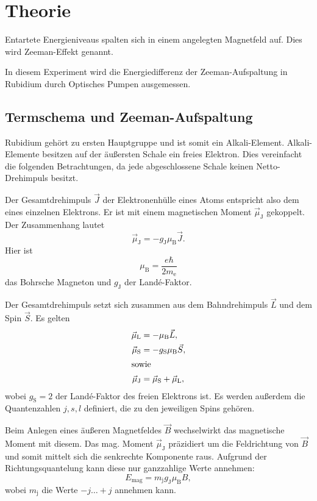 \section{Theorie}%
\label{sec:theorie}

Entartete Energieniveaus spalten sich in einem angelegten Magnetfeld auf.
Dies wird Zeeman-Effekt genannt.

In diesem Experiment wird die Energiedifferenz der Zeeman-Aufspaltung in
Rubidium durch Optisches Pumpen ausgemessen.


\subsection{Termschema und Zeeman-Aufspaltung}%
\label{sub:termschema_und_zeeman_aufspaltung}

Rubidium gehört zu ersten Hauptgruppe und ist somit ein Alkali-Element.
Alkali-Elemente besitzen auf der äußersten Schale ein freies Elektron.
Dies vereinfacht die folgenden Betrachtungen, da jede abgeschlossene Schale
keinen Netto-Drehimpuls besitzt.

Der Gesamtdrehimpuls $\vec{J}$ der Elektronenhülle eines Atoms entspricht also
dem eines einzelnen Elektrons.
Er ist mit einem magnetischen Moment $\vec{\mu}_{\text{J}}$ gekoppelt.
Der Zusammenhang lautet
\begin{equation}
  \vec{\mu}_{\text{J}} = -g_{\text{J}} \mu_{\text{B}} \vec{J}.
\end{equation}
Hier ist
\begin{equation}
  \mu_{\text{B}} = \frac{e \hbar}{2 m_\text{e}}
\end{equation}
das Bohrsche Magneton und $g_{\text{J}}$ der Land\'e-Faktor.

Der Gesamtdrehimpuls setzt sich zusammen aus dem Bahndrehimpuls $\vec{L}$ und
dem Spin $\vec{S}$.
Es gelten
\begin{align}
  \vec{\mu}_{\text{L}} &= -\mu_{\text{B}} \vec{L}, \\
  \vec{\mu}_{\text{S}} &= -g_{\text{S}} \mu_{\text{B}} \vec{S}, \\
  \intertext{sowie}
  \vec{\mu}_{\text{J}} &= \vec{\mu}_{\text{S}} + \vec{\mu}_{\text{L}},
\end{align}
wobei $g_{\text{S}} = \num{2}$ der Land\'e-Faktor des freien Elektrons ist.
Es werden außerdem die Quantenzahlen $j, s, l$ definiert, die zu den jeweiligen Spins
gehören.

Beim Anlegen eines äußeren Magnetfeldes $\vec{B}$ wechselwirkt das magnetische Moment mit diesem.
Das mag. Moment $\vec{\mu}_{\text{J}}$ präzidiert um die Feldrichtung von
$\vec{B}$ und somit mittelt sich die senkrechte Komponente raus.
Aufgrund der Richtungsquantelung kann diese nur ganzzahlige Werte annehmen:
\begin{equation}
  E_\text{mag} = m_\text{j} g_{\text{J}} \mu_\text{B} B,
\end{equation}
wobei $m_\text{j}$ die Werte $-j \ldots +j$ annehmen kann.

